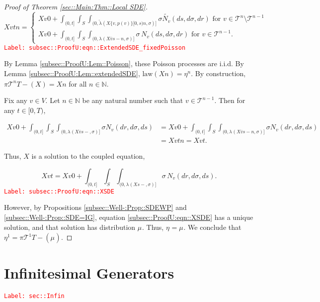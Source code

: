 \documentclass[12pt]{article}
\newcommand{\mb}{\mathbb}
\newcommand{\mc}{\mathcal}
\newcommand{\ov}{\overline}
\newcommand{\te}{\text}
\newcommand{\tr}{\textcolor{red}}
\newcommand{\labe}[1]{\tr{\texttt{Label: #1}}}
\newcommand{\ind}{\hspace{24pt}}
\renewcommand{\v}{v}							%
\renewcommand{\S}{S}							%
\newcommand{\s}{\sigma}							%
\newcommand{\T}{T}								%
\renewcommand{\t}{t}							%
\newcommand{\proj}{\pi}							%
\renewcommand{\tt}{s}							%
\newcommand{\X}{X}								%
\newcommand{\cl}{\ov}							%
\newcommand{\poiss}[1]{N_{#1}}						%
\newcommand{\pup}[1]{^{#1}}							%
\newcommand{\tree}{\mc{T}}							%
\newcommand{\V}{V}									%
\renewcommand{\r}{r}								%
\newcommand{\numb}{n}								%
\newcommand{\m}[3]{\mu_{#2#1}^{#3}}						%
\newcommand{\mmm}[3]{\eta_{#2#1}^{#3}}						%
\newcommand{\rate}[1]{\lambda_{#1}}					%
\newcommand{\crate}[2]{\alt{\lambda}_{#1}^{#2}}		%
\newcommand{\alt}{\widetilde}						%
\newcommand{\p}[1]{p(#1)}						%
\begin{document}
\begin{proof}[Proof of Theorem \ref{sec::Main:Thm::Local SDE}]
\begin{equation}
\X{\v}{\t}{\numb} = \begin{cases}
\X{\v}{0}{} + \int_{(0,\t]}\int_\S\int_{(0,\crate{}{}(\X{\{\v,\p{\v}\}}{[0,\tt)}{\numb},\s)]}\s\alt{\poiss{\v}}(d\tt,d\s,d\r)\te{ for } \v \in \tree\pup{\numb}\setminus\tree\pup{\numb-1}\\
\X{\v}{0}{} + \int_{(0,\t]}\int_\S\int_{(0,\rate{}(\X{\cl{\v}}{\tt-}{\numb},\s)]}\s\,\poiss{\v}(d\tt,d\s,d\r)\te{ for } \v \in \tree\pup{\numb-1}.
\end{cases}
\label{subsec::ProofU:eqn::ExtendedSDE_fixedPoisson}
\end{equation}
\labe{subsec::ProofU:eqn::ExtendedSDE\_fixedPoisson}

By Lemma \ref{subsec::ProofU:Lem::Poisson}, these Poisson processes are i.i.d. By Lemma \ref{subsec::ProofU:Lem::extendedSDE}, \(\te{law}(\X{}{}{\numb}) = \mmm{}{}{\numb}\). By construction, \(\proj{\tree\pup{\numb}}{\T-}(\X{}{}) = \X{}{}{\numb}\) for all \(\numb\in\mb{N}\).

\ind Fix any \(\v\in\V\). Let \(\numb\in \mb{N}\) be any natural number such that \(\v\in \tree\pup{\numb-1}\). Then for any \(\t \in [0,\T)\),

\begin{align*}
\X{\v}{0} + \int_{(0,\t]}\int_\S\int_{(0,\rate{}(\X{\cl{\v}}{\tt-},\s)]}\s\poiss{\v}(d\r,d\s,d\tt) &= \X{\v}{0} + \int_{(0,\t]}\int_\S\int_{(0,\rate{}(\X{\cl{\v}}{\tt-}{\numb},\s)]}\s\poiss{\v}(d\r,d\s,d\tt)\\
&=\X{\v}{\t}{\numb} = \X{\v}{\t}.
\end{align*}

Thus, \(\X{}{}\) is a solution to the coupled equation,

\begin{equation}
\X{\v}{\t} = \X{\v}{0} + \int_{(0,\t]}\int_\S \int_{(0,\rate{}(\X{}{\tt-},\s)]}\s\,\poiss{\v}(d\r,d\s,d\tt).
\label{subsec::ProofU:eqn::XSDE}
\end{equation}
\labe{subsec::ProofU:eqn::XSDE}

However, by Propositions \ref{subsec::Well-:Prop::SDEWP} and \ref{subsec::Well-:Prop::SDE=IG}, equation \eqref{subsec::ProofU:eqn::XSDE} has a unique solution, and that solution has distribution \(\m{}{}{}\). Thus, \(\mmm{}{}{} = \m{}{}{}\). We conclude that \(\mmm{}{}{1} = \proj{\tree\pup{1}}{\T-}(\m{}{}{})\).

\end{proof}
\newpage
\appendix

\section{Infinitesimal Generators}
\label{sec::Infin}\labe{sec::Infin}
\end{document}
